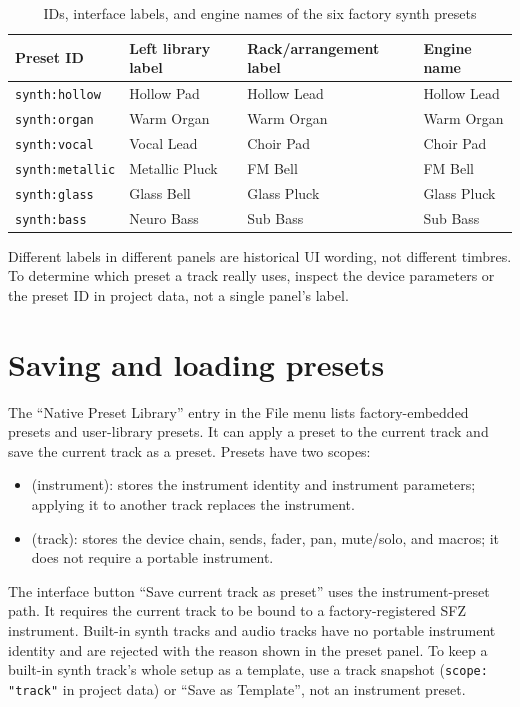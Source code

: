 \begin{table}[htbp]
\centering
\small
\begin{tabular}{@{}llll@{}}
\hline
Preset ID & Left library label & Rack/arrangement label & Engine name \\
\hline
\texttt{synth:hollow} & Hollow Pad & Hollow Lead & Hollow Lead \\
\texttt{synth:organ} & Warm Organ & Warm Organ & Warm Organ \\
\texttt{synth:vocal} & Vocal Lead & Choir Pad & Choir Pad \\
\texttt{synth:metallic} & Metallic Pluck & FM Bell & FM Bell \\
\texttt{synth:glass} & Glass Bell & Glass Pluck & Glass Pluck \\
\texttt{synth:bass} & Neuro Bass & Sub Bass & Sub Bass \\
\hline
\end{tabular}
\caption{IDs, interface labels, and engine names of the six factory synth presets}
\label{tab:factory-synth-presets}
\end{table}

Different labels in different panels are historical UI wording, not different
timbres. To determine which preset a track really uses, inspect the device
parameters or the preset ID in project data, not a single panel's label.

\section{Saving and loading presets}

The ``Native Preset Library'' entry in the File menu lists factory-embedded
presets and user-library presets. It can apply a preset to the current track and
save the current track as a preset. Presets have two scopes:

\begin{itemize}
  \item {} (instrument): stores the instrument identity and
        instrument parameters; applying it to another track replaces the instrument.
  \item {} (track): stores the device chain, sends, fader,
        pan, mute/solo, and macros; it does not require a portable instrument.
\end{itemize}

The interface button ``Save current track as preset'' uses the instrument-preset
path. It requires the current track to be bound to a factory-registered SFZ
instrument. Built-in synth tracks and audio tracks have no portable instrument
identity and are rejected with the reason shown in the preset panel. To keep a
built-in synth track's whole setup as a template, use a track snapshot
(\texttt{scope: "track"} in project data) or ``Save as Template'', not an
instrument preset.

